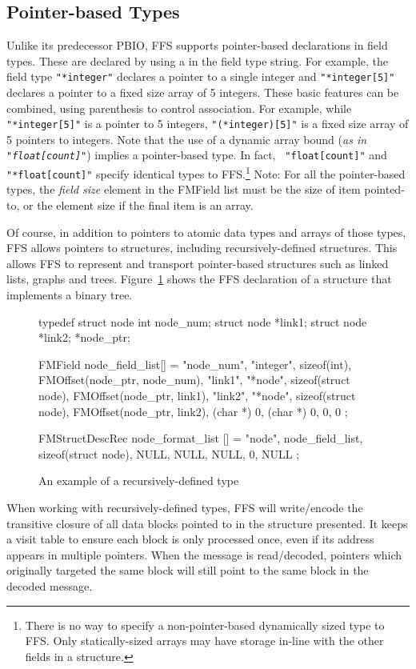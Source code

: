 \subsection{Pointer-based Types\label{dynamic_array}} 
Unlike its predecessor PBIO, FFS supports pointer-based declarations in
field types.  These are declared by using a {\tt *} in the field type
string.  For example, the field type {\tt "*integer"} declares a pointer to
a single integer and {\tt "*integer[5]"} declares a pointer to a fixed size
array of 5 integers.  These basic features can be combined, using
parenthesis to control association.  For example, while {\tt "*integer[5]"}
is a pointer to 5 integers, {\tt "(*integer)[5]"} is a fixed size array of 5
pointers to integers.  Note that the use of a dynamic array bound ({\it as
  in {\tt "float[count]"}}) implies a pointer-based type.  In fact, {\tt
  "float[count]"} and {\tt "*float[count]"} specify identical types to
FFS.\footnote{There is no way to specify a non-pointer-based dynamically
  sized type to FFS.  Only statically-sized arrays may have storage in-line
  with the other fields in a structure.}  Note:  For all the pointer-based
types, the {\em field size} element in the FMField list must be the size of
item pointed-to, or the element size if the final item is an array.

Of course, in addition to pointers to atomic data types and arrays of those
types, FFS allows pointers to structures, including recursively-defined
structures.  This allows FFS to represent and transport pointer-based
structures such as linked lists, graphs and trees.
Figure~\ref{fig:recursive} shows the FFS declaration of a structure that
implements a binary tree.
\begin{figure}
\begin{WrapCode}
typedef struct node {
    int node_num;
    struct node *link1;
    struct node *link2;
} *node_ptr;

FMField node_field_list[] = 
{
    {"node_num", "integer", sizeof(int), FMOffset(node_ptr, node_num)},
    {"link1", "*node", sizeof(struct node), FMOffset(node_ptr, link1)},
    {"link2", "*node", sizeof(struct node), FMOffset(node_ptr, link2)},
    {(char *) 0, (char *) 0, 0, 0}
};

FMStructDescRec node_format_list [] = {
    {"node", node_field_list, sizeof(struct node), NULL},
    {NULL, NULL, 0, NULL}
};
\end{WrapCode}
\caption{An example of a recursively-defined type\label{fig:recursive}}
\end{figure}
When working with recursively-defined types, FFS will write/encode the
transitive closure of all data blocks pointed to in the structure
presented.  It keeps a visit table to ensure each block is only processed
once, even if its address appears in multiple pointers.  When the message is
read/decoded, pointers which originally targeted the same block will still
point to the same block in the decoded message.

